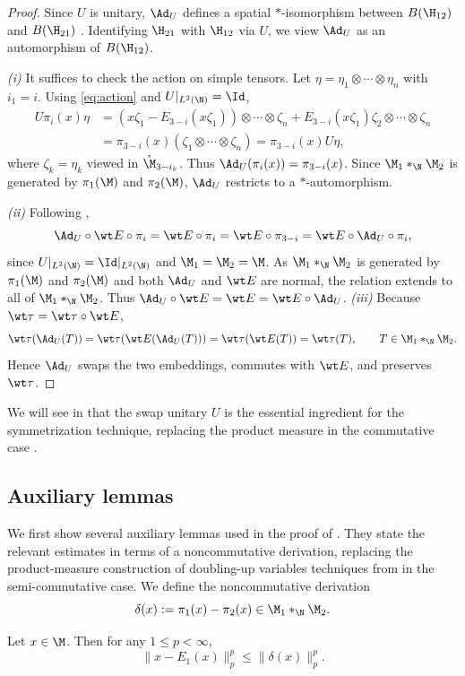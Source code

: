 \documentclass[sn-mathphys-num]{sn-jnl}
\begin{document}
\begin{proof}
Since $U$ is unitary, $\Ad_U$ defines a spatial $*$-isomorphism between
$B(\H_{12})$ and $B(\H_{21})$ \cite[Section 3]{Takesaki_1979}.
Identifying $\H_{21}$ with $\H_{12}$ via $U$, we view $\Ad_U$ as an automorphism
of $B(\H_{12})$.

\emph{(i)}
It suffices to check the action on simple tensors.
Let $\eta=\eta_1\otimes\cdots\otimes\eta_n$ with $i_1=i$.
Using \cref{eq:action} and $U|_{L^2(\N)}=\Id$,
\begin{align*}
U\pi_i(x)\eta
&=(x\zeta_1-E_{3-i}(x\zeta_1))\otimes\cdots\otimes\zeta_n
+E_{3-i}(x\zeta_1)\zeta_2\otimes\cdots\otimes\zeta_n \\
&=\pi_{3-i}(x)(\zeta_1\otimes\cdots\otimes\zeta_n)
=\pi_{3-i}(x)U\eta,
\end{align*}
where $\zeta_k=\eta_k$ viewed in $\mathring{\M}_{3-i_k}$.
Thus $\Ad_U(\pi_i(x))=\pi_{3-i}(x)$.
Since $\M_1*_{\N}\M_2$ is generated by $\pi_1(\M)$ and $\pi_2(\M)$,
$\Ad_U$ restricts to a $*$-automorphism.

\emph{(ii)} Following , \[ \Ad_U  \circ \wt E\circ\pi_i=\wt E \circ \pi_i=\wt E \circ \pi_{3-i}=\wt E \circ \Ad_U \circ \pi_i, \] since $U|_{L^2(\N)}=\Id|_{L^2(\N)}$ and $\M_1=\M_2=\M$. As $\M_1*_\N \M_2$ is generated by $\pi_1(\M)$ and $\pi_2(\M)$ and both $\Ad_U$ and $\wt E$ are normal, the relation extends to all of $\M_1*_\N \M_2$. Thus $\Ad_U\circ \wt E=\wt E =\wt E\circ \Ad_U$.
\emph{(iii)} Because $\wt\tau=\wt\tau\circ\wt E$, \[ \wt\tau(\Ad_U(T)) = \wt\tau(\wt E(\Ad_U(T))) = \wt\tau(\wt E(T)) = \wt\tau(T), \qquad T\in\M_1*_\N\M_2. \] Hence $\Ad_U$ swaps the two embeddings, commutes with $\wt E$, and preserves $\wt\tau$.
\end{proof}

We will see in  that the swap unitary $U$
is the essential ingredient for the symmetrization technique,
replacing the product measure in the commutative case
\cite[Section~4.1]{huang2021poincare}.


\subsection{Auxiliary lemmas}
We first show several auxiliary lemmas used in the proof of .
They state the relevant estimates in terms of a noncommutative derivation,
replacing the product-measure construction of doubling-up variables techniques from \cite{huang2021poincare} in the semi-commutative case.
We define the noncommutative derivation
\[
  \delta(x):=\pi_1(x)-\pi_2(x)\in\M_1*_\N\M_2 .
\]
\begin{lemma}\label{lem:contraction}
Let $x\in\M$.
Then for any $1\le p<\infty$,
\[
  \|x-E_1(x)\|_p^p \le \|\delta(x)\|_p^p .
\]
\end{lemma}
\end{document}
